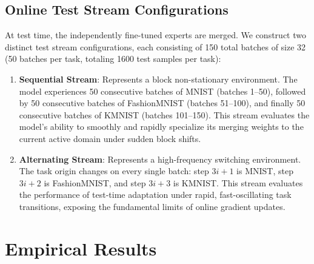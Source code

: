 \documentclass{article}
\theoremstyle{plain}
\theoremstyle{definition}
\theoremstyle{remark}
\begin{document}
\subsection{Online Test Stream Configurations}
At test time, the independently fine-tuned experts are merged. We construct two distinct test stream configurations, each consisting of 150 total batches of size 32 (50 batches per task, totaling 1600 test samples per task):
\begin{enumerate}
  \item \textbf{Sequential Stream}: Represents a block non-stationary environment. The model experiences 50 consecutive batches of MNIST (batches 1--50), followed by 50 consecutive batches of FashionMNIST (batches 51--100), and finally 50 consecutive batches of KMNIST (batches 101--150). This stream evaluates the model's ability to smoothly and rapidly specialize its merging weights to the current active domain under sudden block shifts.
  \item \textbf{Alternating Stream}: Represents a high-frequency switching environment. The task origin changes on every single batch: step $3i+1$ is MNIST, step $3i+2$ is FashionMNIST, and step $3i+3$ is KMNIST. This stream evaluates the performance of test-time adaptation under rapid, fast-oscillating task transitions, exposing the fundamental limits of online gradient updates.
\end{enumerate}

\section{Empirical Results}
\label{sec:results}
\end{document}
